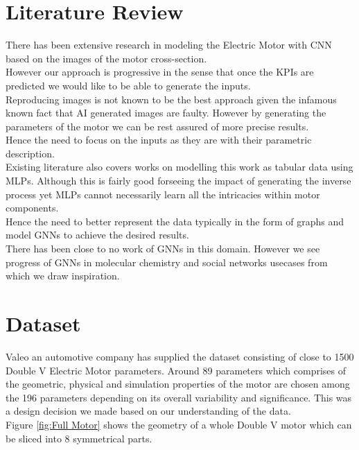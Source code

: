 \documentclass{report} %
\begin{document}
\newpage 

\chapter{Literature Review} 
There has been extensive research in modeling the Electric Motor with \ac{CNN} based on the images of the motor cross-section. \\
However our approach is progressive in the sense that once the \ac{KPI}s are predicted we would like to be able to generate the inputs.\\
Reproducing images is not known to be the best approach given the infamous known fact that AI generated images are faulty. However by generating the parameters of the motor we can be rest assured of more precise results. \\
Hence the need to focus on the inputs as they are with their parametric description.\\
Existing literature also covers works on modelling this work as tabular data using \ac{MLP}s. 
Although this is fairly good forseeing the impact of generating the inverse process yet \ac{MLP}s cannot necessarily learn all the intricacies within motor components. \\
Hence the need to better represent the data typically in the form of graphs and model \ac{GNN}s to achieve the desired results. \\
There has been close to no work of \ac{GNN}s in this domain. However we see progress of \ac{GNN}s in molecular chemistry and social networks usecases from which we draw inspiration.\\

\newpage 

\chapter{Dataset} 
Valeo an automotive company has supplied the dataset consisting of close to 1500 Double V Electric Motor parameters. 
Around 89 parameters which comprises of the geometric, physical and simulation properties of the motor are chosen among the 196 parameters depending on its overall variability and significance.
This was a design decision we made based on our understanding of the data.\\
Figure \ref{fig:Full Motor} shows the geometry of a whole Double V motor which can be sliced into 8 symmetrical parts.
\end{document}
